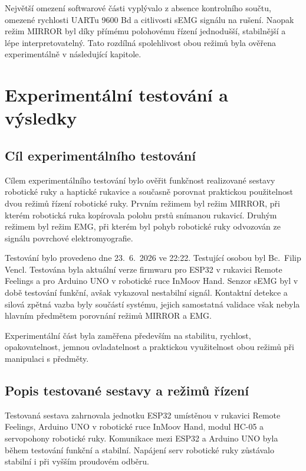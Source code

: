 Největší omezení softwarové části vyplývalo z absence kontrolního součtu, omezené rychlosti UARTu 9600 Bd a citlivosti sEMG signálu na rušení. Naopak režim MIRROR byl díky přímému polohovému řízení jednodušší, stabilnější a lépe interpretovatelný. Tato rozdílná spolehlivost obou režimů byla ověřena experimentálně v následující kapitole.

\chapter{Experimentální testování a výsledky}
\label{chap:experimentalni-testovani}

\section{Cíl experimentálního testování}
\label{sec:cil-testovani}

Cílem experimentálního testování bylo ověřit funkčnost realizované sestavy robotické ruky a haptické rukavice a současně porovnat praktickou použitelnost dvou režimů řízení robotické ruky. Prvním režimem byl režim MIRROR, při kterém robotická ruka kopírovala polohu prstů snímanou rukavicí. Druhým režimem byl režim EMG, při kterém byl pohyb robotické ruky odvozován ze signálu povrchové elektromyografie.

Testování bylo provedeno dne 23.~6.~2026 ve 22:22. Testující osobou byl Bc.~Filip Vencl. Testována byla aktuální verze firmwaru pro ESP32 v rukavici Remote Feelings a pro Arduino UNO v robotické ruce InMoov Hand. Senzor sEMG byl v době testování funkční, avšak vykazoval nestabilní signál. Kontaktní detekce a silová zpětná vazba byly součástí systému, jejich samostatná validace však nebyla hlavním předmětem porovnání režimů MIRROR a EMG\@.

Experimentální část byla zaměřena především na stabilitu, rychlost, opakovatelnost, jemnou ovladatelnost a praktickou využitelnost obou režimů při manipulaci s předměty.

\section{Popis testované sestavy a režimů řízení}
\label{sec:popis-testovane-sestavy}

Testovaná sestava zahrnovala jednotku ESP32 umístěnou v rukavici Remote Feelings, Arduino UNO v robotické ruce InMoov Hand, modul HC-05 a servopohony robotické ruky. Komunikace mezi ESP32 a Arduino UNO byla během testování funkční a stabilní. Napájení serv robotické ruky zůstávalo stabilní i při vyšším proudovém odběru.

